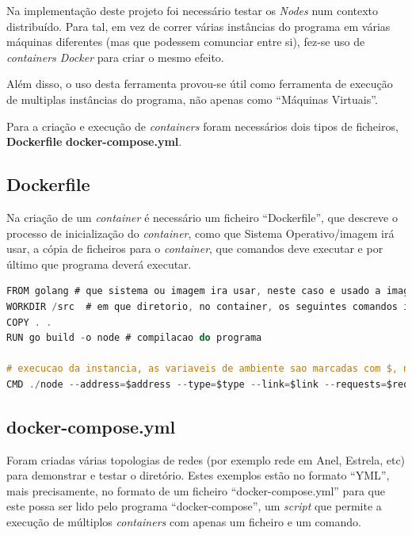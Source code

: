 Na implementação deste projeto foi necessário testar os \emph{Nodes} num contexto distribuído.
Para tal, em vez de correr várias instâncias do programa em várias máquinas diferentes (mas que podessem comunciar entre si), fez-se uso de \emph{containers Docker} para criar o mesmo efeito.

Além disso, o uso desta ferramenta provou-se útil como ferramenta de execução de multiplas instâncias do programa, não apenas como ``Máquinas Virtuais''.

Para a criação e execução de \emph{containers} foram necessários dois tipos de ficheiros, \textbf{Dockerfile} \textbf{docker-compose.yml}.



\subsection*{Dockerfile}

Na criação de um \emph{container} é necessário um ficheiro ``Dockerfile'', que descreve o processo de inicialização do \emph{container}, como que Sistema Operativo/imagem irá usar, a cópia de ficheiros para o \emph{container}, que comandos deve executar e por último que programa deverá executar.


\begin{lstlisting}[caption={Iteração pelo ``Map'' ``Nodes'', instanciação do objeto e adicionado à lista },language=C]
FROM golang # que sistema ou imagem ira usar, neste caso e usado a imagem ``golang''
WORKDIR /src  # em que diretorio, no container, os seguintes comandos irao ser executados
COPY . .
RUN go build -o node # compilacao do programa

# execucao da instancia, as variaveis de ambiente sao marcadas com $, no entanto serao descritas a sua origem de seguida
CMD ./node --address=$address --type=$type --link=$link --requests=$requests --visualization=$VIS_ADDRESS

\end{lstlisting}

\subsection*{docker-compose.yml}

Foram criadas várias topologias de redes (por exemplo rede em Anel, Estrela, etc) para demonstrar e testar o diretório.
Estes exemplos estão no formato ``YML'', mais precisamente, no formato de um ficheiro ``docker-compose.yml'' para que este possa ser lido pelo programa ``docker-compose'', um \emph{script} que permite a execução de múltiplos \emph{containers} com apenas um ficheiro e um comando.


